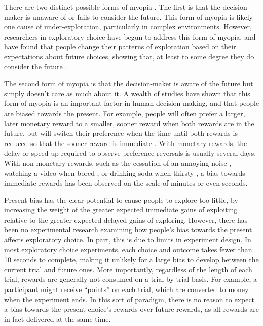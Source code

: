 \documentclass[10pt,letterpaper]{article}
\begin{document}
There are two distinct possible forms of myopia \citep{Bartels2015}. The first is that the decision-maker is
unaware of or fails to consider the future. This form of myopia is likely one
cause of under-exploration, particularly in complex environments. However,
researchers in exploratory choice have begun to address this form of myopia, and
have found that people change their
patterns of exploration based on their expectations about future choices,
showing that, at least to some degree they do consider the future \citep{Wilson2014a, Rich2017}.

The second form of myopia is that the decision-maker
is aware of the future but simply doesn't care as much about it.
A wealth of studies have shown that this form of myopia is an important factor
in human decision making, and that people are 
biased towards  the present. For example, people will often prefer a larger, later monetary
reward to a smaller, sooner reward when both rewards are in the future, but will
switch their preference when the time until both rewards is reduced so that the
sooner reward is immediate \citep{Kirby1995}. With monetary rewards, the delay
or speed-up required to observe preference reversals is usually several days. With non-monetary rewards,
such as the cessation of an annoying noise \citep{Solnick1980}, watching a video
when bored \citep{Navarick1998}, or drinking soda
when thirsty \citep{Brown2009}, a bias towards immediate rewards has been observed on the scale of
minutes or even seconds.

Present bias has the clear potential to cause people to explore too little, by
increasing the weight of the greater expected immediate gains of exploiting relative to
the greater expected delayed gains of exploring. However, there has been no experimental research
examining how people's bias towards the present affects exploratory choice. In
part, this is due to limits in experiment design. In most exploratory
choice experiments, each choice and outcome takes fewer than 10 seconds to
complete, making it unlikely for a large bias to develop between the current
trial and future ones. More importantly, regardless of the length of each trial,
rewards are generally not consumed on a trial-by-trial basis. For example, a participant
might receive ``points'' on each trial, which are converted to money when the
experiment ends. In this sort of paradigm, there is no reason to expect a bias
towards the present choice's rewards over future rewards, as all rewards are
in fact delivered at the same time.
\end{document}
